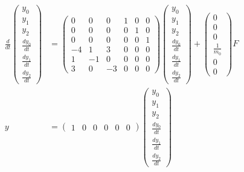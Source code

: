 \documentclass[a4paper,11pt,fleqn]{jreport}
\begin{document}
\begin{align}
 \frac{d}{dt} \left(\begin{array}{c}
	         y_0 \\
		     y_1 \\
		     y_2 \\
		     \frac{dy_0}{dt} \\
		     \frac{dy_1}{dt} \\
		     \frac{dy_2}{dt}
		    \end{array}\right)
 &=
 \left(\begin{array}{rrrrrr}
        0 & 0 & 0 & 1 & 0 & 0      \\
        0 & 0 & 0 & 0 & 1 & 0      \\
        0 & 0 & 0 & 0 & 0 & 1      \\
	-4& 1 & 3 & 0 & 0 & 0 \\
	1 & -1& 0 & 0 & 0 & 0 \\
	3 & 0 & -3& 0 & 0 & 0 
       \end{array}\right)
 \left(\begin{array}{c}
	         y_0 \\
		     y_1 \\
		     y_2 \\
		     \frac{dy_0}{dt} \\
		     \frac{dy_1}{dt} \\
		     \frac{dy_2}{dt}
       \end{array}\right)
 +
 \left(\begin{array}{c}
        0 \\
        0 \\
        0 \\
	    \frac{1}{m_0} \\
	    0 \\
	    0 
       \end{array}\right)
        F
\nonumber
\\
y &=
 \left(\begin{array}{cccccc}
         1 & 0 & 0 & 0 & 0 & 0
       \end{array}\right)
 \left(\begin{array}{c}
	         y_0 \\
		     y_1 \\
		     y_2 \\
		     \frac{dy_0}{dt} \\
		     \frac{dy_1}{dt} \\
		     \frac{dy_2}{dt}
       \end{array}\right)
\nonumber
\end{align}
\end{document}
